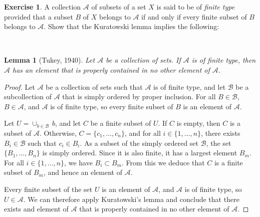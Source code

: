 \documentclass[11pt,a4paper,twoside]{article}
\theoremstyle{definition}
\newcounter{excounter}
\newtheorem{exercise}[excounter]{Exercise}
\theoremstyle{plain}
\newtheorem*{lemma}{Lemma}
\begin{document}
\begin{exercise}

  A collection $\mathscr{A}$ of subsets of a set $X$ is said to be of \emph{finite type}
  provided that a subset $B$ of $X$ belongs to $\mathscr{A}$ if and only if every finite
  subset of $B$ belongs to $\mathscr{A}$.
  Show that the Kuratowski lemma implies the following:

\end{exercise}

~\\
\begin{lemma}[Tukey, 1940]
  Let $\mathscr{A}$ be a collection of sets. If $\mathscr{A}$ is of finite type, then
  $\mathscr{A}$ has an element that is properly contained in no other element of $\mathscr{A}$.
\end{lemma}

\begin{proof}

  Let $\mathscr{A}$ be a collection of sets such that $\mathscr{A}$ is of finite type,
  and let $\mathscr{B}$ be a subcollection of $\mathscr{A}$ that is simply ordered by proper inclusion.
  For all $B \in \mathscr{B}$, $B \in \mathscr{A}$, and $\mathscr{A}$ is of finite type,
  so every finite subset of $B$ is an element of $\mathscr{A}$.

  Let $U = \cup_{b \in \mathscr{B}} \,b$, and let $C$ be a finite subset of $U$.
  If $C$ is empty, then $C$ is a subset of $\mathscr{A}$. Otherwise, $C = \{ c_1, \dotsc, c_n \}$,
  and for all $i \in \{ 1, \dotsc, n \}$, there exists $B_i \in \mathscr{B}$ such that $c_i \in B_i$.
  As a subset of the simply ordered set $\mathscr{B}$, the set $\{ B_1, \dotsc, B_n \}$ is simply ordered.
  Since it is also finite, it has a largest element $B_m$. For all $i \in \{ 1, \dotsc, n \}$,
  we have $B_i \subset B_m$. From this we deduce that $C$ is a finite subset of $B_m$,
  and hence an element of $\mathscr{A}$.

  Every finite subset of the set $U$ is an element of $\mathscr{A}$, and $\mathscr{A}$ is of finite type,
  so $U \in \mathscr{A}$. We can therefore apply Kuratowski's lemma and conclude that there exists
  and element of $\mathscr{A}$ that is properly contained in no other element of $\mathscr{A}$.

\end{proof}
\end{document}
